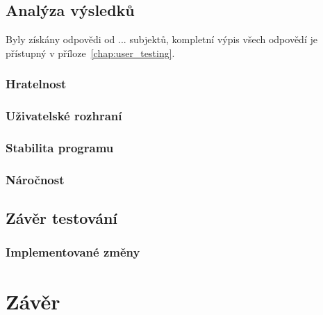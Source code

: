 \section{Analýza výsledků}
Byly získány odpovědi od ... subjektů, kompletní výpis všech odpovědí je přístupný v příloze~\ref{chap:user_testing}.
\subsection*{Hratelnost}
\subsection*{Uživatelské rozhraní}
\subsection*{Stabilita programu}
\subsection*{Náročnost}

\section{Závěr testování}
\subsection*{Implementované změny}

\chapter{Závěr}

%

